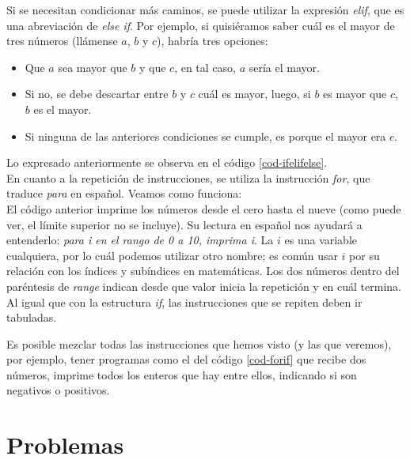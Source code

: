 

Si se necesitan condicionar más caminos, se puede utilizar la expresión \emph{elif}, que es una abreviación de \emph{else if}. Por ejemplo, si quisiéramos saber cuál es el mayor de tres números (llámense $a$, $b$ y $c$), habría tres opciones: 
\begin{itemize}
\item Que $a$ sea mayor que $b$ y que $c$, en tal caso, $a$ sería el mayor.

\item Si no, se debe descartar entre $b$ y $c$ cuál es mayor, luego, si $b$ es mayor que $c$, $b$ es el mayor.

\item Si ninguna de las anteriores condiciones se cumple, es porque el mayor era $c$. 
\end{itemize}


Lo expresado anteriormente se observa en el código \ref{cod-ifelifelse}.  \\



En cuanto a la repetición de instrucciones, se utiliza la instrucción \emph{for}, que traduce \emph{para} en español. Veamos como funciona: \\



El código anterior imprime los números desde el cero hasta el nueve (como puede ver, el límite superior no se incluye). Su lectura en español nos ayudará a entenderlo: \emph{para i en el rango de 0 a 10, imprima i}. La $i$ es una variable cualquiera, por lo cuál podemos utilizar otro nombre; es común usar $i$ por su relación con los índices y subíndices en matemáticas. Los dos números dentro del paréntesis de \emph{range} indican desde que valor inicia la repetición y en cuál termina. Al igual que con la estructura \emph{if}, las instrucciones que se repiten deben ir tabuladas.

Es posible mezclar todas las instrucciones que hemos visto (y las que veremos), por ejemplo, tener programas como el del código \ref{cod-forif} que recibe dos números, imprime todos los enteros que hay entre ellos, indicando si son negativos o positivos.






\section{Problemas}



\newpage